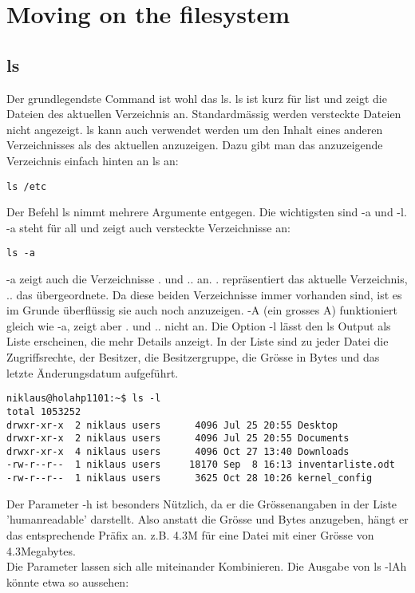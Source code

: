 
\section{Moving on the filesystem}
\subsection{ls}
Der grundlegendste Command ist wohl das ls. ls ist kurz f\"ur list und zeigt die Dateien des aktuellen Verzeichnis an. Standardm\"assig werden versteckte Dateien nicht angezeigt. ls kann auch verwendet werden um den Inhalt eines anderen Verzeichnisses als des aktuellen anzuzeigen. Dazu gibt man das anzuzeigende Verzeichnis einfach hinten an ls an:
\begin{lstlisting}[frame=single]
ls /etc
\end{lstlisting}
Der Befehl ls nimmt mehrere Argumente entgegen. Die wichtigsten sind -a und -l.\\
-a steht f\"ur all und zeigt auch versteckte Verzeichnisse an:
\begin{lstlisting}[frame=single]
ls -a
\end{lstlisting}
-a zeigt auch die Verzeichnisse . und .. an. . repr\"asentiert das aktuelle Verzeichnis, .. das \"ubergeordnete. Da diese beiden Verzeichnisse immer vorhanden sind, ist es im Grunde \"uberfl\"ussig sie auch noch anzuzeigen. -A (ein grosses A) funktioniert gleich wie -a, zeigt aber . und .. nicht an.
Die Option -l l\"asst den ls Output als Liste erscheinen, die mehr Details anzeigt. In der Liste sind zu jeder Datei die Zugriffsrechte, der Besitzer, die Besitzergruppe, die Gr\"osse in Bytes und das letzte \"Anderungsdatum aufgef\"uhrt.
\begin{lstlisting}[frame=single]
niklaus@holahp1101:~$ ls -l
total 1053252
drwxr-xr-x  2 niklaus users      4096 Jul 25 20:55 Desktop
drwxr-xr-x  2 niklaus users      4096 Jul 25 20:55 Documents
drwxr-xr-x  4 niklaus users      4096 Oct 27 13:40 Downloads
-rw-r--r--  1 niklaus users     18170 Sep  8 16:13 inventarliste.odt
-rw-r--r--  1 niklaus users      3625 Oct 28 10:26 kernel_config
\end{lstlisting}
Der Parameter -h ist besonders N\"utzlich, da er die Gr\"ossenangaben in der Liste 'humanreadable' darstellt. Also anstatt die Gr\"osse und Bytes anzugeben, h\"angt er das entsprechende Pr\"afix an. z.B. 4.3M f\"ur eine Datei mit einer Gr\"osse von 4.3Megabytes.\\
Die Parameter lassen sich alle miteinander Kombinieren. Die Ausgabe von ls -lAh k\"onnte etwa so aussehen:
